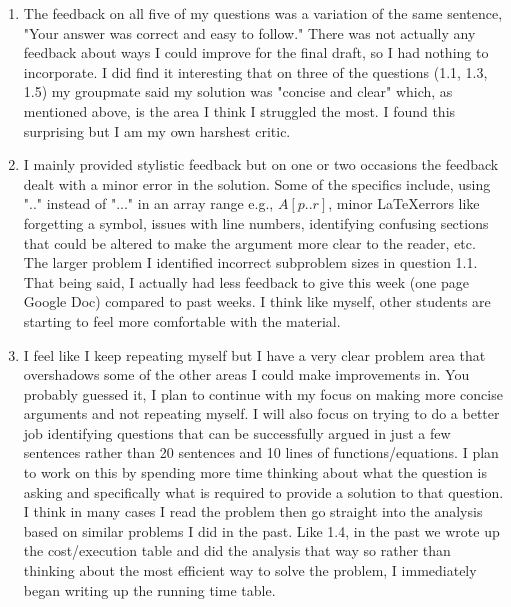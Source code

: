\documentclass[11pt]{article}
\theoremstyle{nonumberplain}
\begin{document}
\begin{enumerate}
\item The feedback on all five of my questions was a variation of the same sentence, "Your answer was correct and easy to follow." There was not actually any feedback about ways I could improve for the final draft, so I had nothing to incorporate. I did find it interesting that on three of the questions (1.1, 1.3, 1.5) my groupmate said my solution was "concise and clear" which, as mentioned above, is the area I think I struggled the most. I found this surprising but I am my own harshest critic.   
\item I mainly provided stylistic feedback but on one or two occasions the feedback dealt with a minor error in the solution. Some of the specifics include, using ".." instead of "..." in an array range e.g., $A[p..r]$, minor \LaTeX errors like forgetting a symbol, issues with line numbers, identifying confusing sections that could be altered to make the argument more clear to the reader, etc. The larger problem I identified incorrect subproblem sizes in question 1.1. That being said, I actually had less feedback to give this week (one page Google Doc) compared to past weeks. I think like myself, other students are starting to feel more comfortable with the material. 
\item I feel like I keep repeating myself but I have a very clear problem area that overshadows some of the other areas I could make improvements in. You probably guessed it, I plan to continue with my focus on making more concise arguments and not repeating myself. I will also focus on trying to do a better job identifying questions that can be successfully argued in just a few sentences rather than 20 sentences and 10 lines of functions/equations. I plan to work on this by spending more time thinking about what the question is asking and specifically what is required to provide a solution to that question. I think in many cases I read the problem then go straight into the analysis based on similar problems I did in the past. Like 1.4, in the past we wrote up the cost/execution table and did the analysis that way so rather than thinking about the most efficient way to solve the problem, I immediately began writing up the running time table.      
\end{enumerate}

\end{document}
